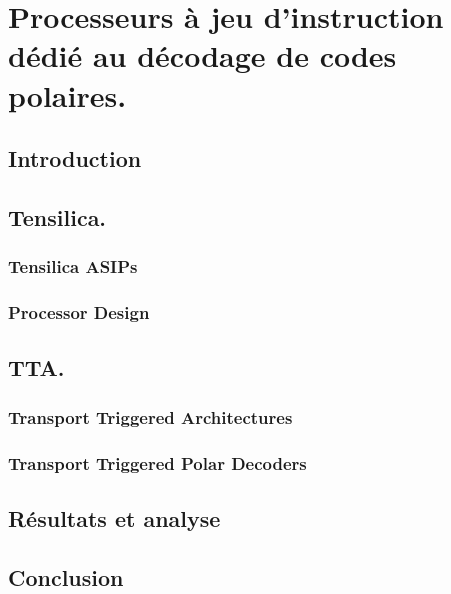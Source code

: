 \chapter{Processeurs à jeu d'instruction dédié au décodage de codes polaires.} %


\vspace*{\fill}
\minitocTITI
\vspace*{\fill}
\newpage

\section{Introduction}
\section{Tensilica.}
\subsection{Tensilica ASIPs}
\subsection{Processor Design}
\section{TTA.}
\subsection{Transport Triggered Architectures}
\subsection{Transport Triggered Polar Decoders}
\section{Résultats et analyse}
\section{Conclusion}

